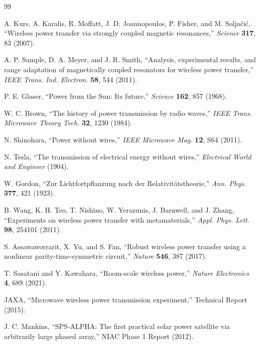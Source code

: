\documentclass[aps,prd,twocolumn,superscriptaddress,nofootinbib]{revtex4-2}
\begin{document}
\begin{thebibliography}{99}

A. Kurs, A. Karalis, R. Moffatt, J. D. Joannopoulos, P. Fisher, and
M. Solja\v{c}i\'{c}, ``Wireless power transfer via strongly coupled
magnetic resonances,'' \textit{Science} \textbf{317}, 83 (2007).

A. P. Sample, D. A. Meyer, and J. R. Smith, ``Analysis, experimental
results, and range adaptation of magnetically coupled resonators for
wireless power transfer,'' \textit{IEEE Trans. Ind. Electron.}
\textbf{58}, 544 (2011).

P. E. Glaser, ``Power from the Sun: Its future,''
\textit{Science} \textbf{162}, 857 (1968).

W. C. Brown, ``The history of power transmission by radio waves,''
\textit{IEEE Trans. Microwave Theory Tech.} \textbf{32}, 1230 (1984).

N. Shinohara, ``Power without wires,''
\textit{IEEE Microwave Mag.} \textbf{12}, S64 (2011).

N. Tesla, ``The transmission of electrical energy without wires,''
\textit{Electrical World and Engineer} (1904).

W. Gordon, ``Zur Lichtfortpflanzung nach der Relativit\"{a}tstheorie,''
\textit{Ann. Phys.} \textbf{377}, 421 (1923).

B. Wang, K. H. Teo, T. Nishino, W. Yerazunis, J. Barnwell, and
J. Zhang, ``Experiments on wireless power transfer with metamaterials,''
\textit{Appl. Phys. Lett.} \textbf{98}, 254101 (2011).

S. Assawaworrarit, X. Yu, and S. Fan, ``Robust wireless power transfer
using a nonlinear parity-time-symmetric circuit,''
\textit{Nature} \textbf{546}, 387 (2017).

T. Sasatani and Y. Kawahara, ``Room-scale wireless power,''
\textit{Nature Electronics} \textbf{4}, 689 (2021).

JAXA, ``Microwave wireless power transmission experiment,''
Technical Report (2015).

J. C. Mankins, ``SPS-ALPHA: The first practical solar power satellite
via arbitrarily large phased array,'' NIAC Phase 1 Report (2012).


\end{thebibliography}
\end{document}
